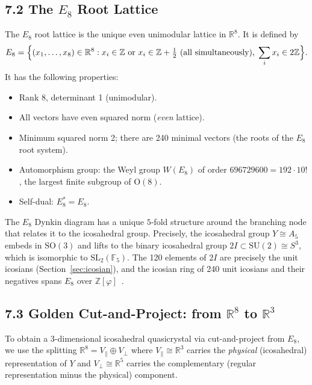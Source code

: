 \subsection{7.2 The \texorpdfstring{$E_8$}{E8}
Root Lattice}\label{sec:e8-lattice}

The \(E_8\) root lattice is the unique
even unimodular lattice in \(\mathbb{R}^8\). It
is defined by
\[
  E_8 = \Bigl\{
    (x_1, \ldots, x_8) \in \mathbb{R}^8 :
    x_i \in \mathbb{Z} \text{ or }
    x_i \in \mathbb{Z} + \tfrac{1}{2} \text{ (all simultaneously)},\;
    \sum_{i} x_i \in 2\mathbb{Z}
  \Bigr\}.
\]
It has the following properties:
\begin{itemize}
  \item Rank 8, determinant 1 (unimodular).
  \item All vectors have even squared norm
        (\emph{even} lattice).
  \item Minimum squared norm 2; there are 240
        minimal vectors (the roots of the \(E_8\)
        root system).
  \item Automorphism group: the Weyl group
        \(W(E_8)\) of order \(696729600 = 192 \cdot
        10!\), the largest finite subgroup of
        \(\mathrm{O}(8)\).
  \item Self-dual: \(E_8^* = E_8\).
\end{itemize}

The \(E_8\) Dynkin diagram has a unique
\(5\)-fold structure around the branching node
that relates it to the icosahedral group. Precisely,
the icosahedral group \(Y \cong A_5\) embeds in
\(\mathrm{SO}(3)\) and lifts to the binary
icosahedral group \(2I \subset \mathrm{SU}(2) \cong
S^3\), which is isomorphic to \(\mathrm{SL}_2(\mathbb{F}_5)\).
The 120 elements of \(2I\) are precisely the unit
icosians (Section~\ref{sec:icosian}), and the
icosian ring of 240 unit icosians and their
negatives spans \(E_8\) over
\(\mathbb{Z}[\varphi]\)~\cite{conway1988sphere}.

\subsection{7.3 Golden Cut-and-Project: from
\texorpdfstring{$\mathbb{R}^8$}{R8} to
\texorpdfstring{$\mathbb{R}^3$}{R3}}\label{sec:e8-to-r3}

To obtain a 3-dimensional icosahedral quasicrystal
via cut-and-project from \(E_8\), we use the
splitting \(\mathbb{R}^8 = V_\parallel \oplus
V_\perp\) where \(V_\parallel \cong \mathbb{R}^3\)
carries the \emph{physical} (icosahedral)
representation of \(Y\) and \(V_\perp \cong
\mathbb{R}^5\) carries the complementary (regular
representation minus the physical) component.

